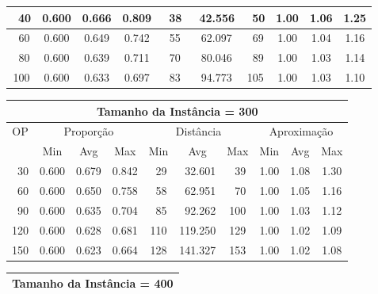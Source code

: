\begin{table}[!tb]
\begin{center}
{\begin{tabular}{|c|c|c|c|c|c|c|c|c|c|}
~40                 & 0.600     & 0.666    & 0.809    & ~38      & ~42.556  & ~50     & 1.00    & 1.06   & 1.25            \\ \hline
~60                 & 0.600     & 0.649    & 0.742    & ~55      & ~62.097  & ~69     & 1.00    & 1.04   & 1.16            \\ \hline
~80                 & 0.600     & 0.639    & 0.711    & ~70      & ~80.046  & ~89     & 1.00    & 1.03   & 1.14            \\ \hline
100                 & 0.600     & 0.633    & 0.697    & ~83      & ~94.773  & 105     & 1.00    & 1.03   & 1.10            \\ \hline
\end{tabular}%
\vspace{5pt}
\begin{tabular}{|c|c|c|c|c|c|c|c|c|c|}
\hline
\multicolumn{10}{|c|}{\bf Tamanho da Instância = 300}                                                                          \\ \hline
\multirow{2}{*}{OP} & \multicolumn{3}{c|}{Proporção} & \multicolumn{3}{c|}{Distância} & \multicolumn{3}{c|}{Aproximação}   \\ \cline{2-10}
                    & Min       & Avg      & Max      & Min      & Avg      & Max     & Min     & Avg    & Max             \\ \hline
~30                 & 0.600     & 0.679    & 0.842    & ~29      & ~32.601  & ~39     & 1.00    & 1.08   & 1.30            \\ \hline
~60                 & 0.600     & 0.650    & 0.758    & ~58      & ~62.951  & ~70     & 1.00    & 1.05   & 1.16            \\ \hline
~90                 & 0.600     & 0.635    & 0.704    & ~85      & ~92.262  & 100     & 1.00    & 1.03   & 1.12            \\ \hline
120                 & 0.600     & 0.628    & 0.681    & 110      & 119.250  & 129     & 1.00    & 1.02   & 1.09            \\ \hline
150                 & 0.600     & 0.623    & 0.664    & 128      & 141.327  & 153     & 1.00    & 1.02   & 1.08            \\ \hline
\end{tabular}%
\vspace{5pt}
\begin{tabular}{|c|c|c|c|c|c|c|c|c|c|}
\hline
\multicolumn{10}{|c|}{\bf Tamanho da Instância = 400}                                                                          \\ \hline

\end{tabular}}
\end{center}
\end{table}
